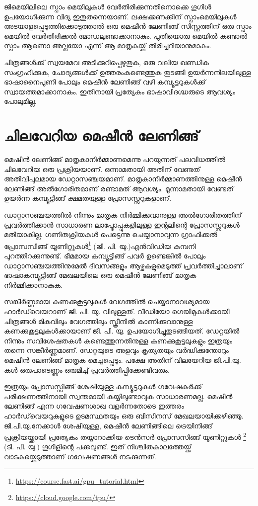 \documentclass[12pt,twoside,a4paper]{article}
\begin{document}
ജിമെയിലിലെ സ്പാം മെയിലുകൾ വേർതിരിക്കുന്നതിനൊക്കെ ഗൂഗിൾ ഉപയോഗിക്കുന്ന വിദ്യ ഇതുതന്നെയാണ്. ലക്ഷക്കണക്കിന് സ്പാംമെയിലുകൾ അടയാളപ്പെടുത്തിക്കൊടുത്താൽ ഒരു മെഷീൻ ലേണിങ്ങ് സിസ്റ്റത്തിന് ഒരു സ്പാം മെയിൽ വേർതിരിക്കൽ മോഡലുണ്ടാക്കാനാകും. പുതിയൊരു മെയിൽ കണ്ടാൽ സ്പാം ആണൊ അല്ലയോ എന്ന് ആ മാതൃകയ്ക്ക് തിരിച്ചറിയാനുമാകും.

ചിത്രങ്ങൾക്ക് സ്വയമേവ അടിക്കുറിപ്പെഴുതുക, ഒരു വലിയ ഖണ്ഡിക സംഗ്രഹിക്കുക, ചോദ്യങ്ങൾക്ക് ഉത്തരംകണ്ടെത്തുക തുടങ്ങി ഉയർന്നനിലയിലുള്ള ഭാഷാനൈപുണി പോലും മെഷീൻ ലേണിങ്ങ് വഴി കമ്പ്യൂട്ടറുകൾക്ക് സ്വായത്തമാക്കാനാകും. ഇതിനായി പ്രത്യേകം ഭാഷാവിദഗ്ദ്ധരുടെ ആവശ്യം പോലുമില്ല.

\section{ചിലവേറിയ മെഷീൻ ലേണിങ്ങ്}

മെഷീൻ ലേണിങ്ങ് മാതൃകാനിർമ്മാണമെന്നു പറയുന്നത് പലവിധത്തിൽ ചിലവേറിയ ഒരു പ്രക്രിയയാണ്. ഒന്നാമതായി അതിന് വേണ്ടത് അതിവിപുലമായ ഡേറ്റാസഞ്ചയമാണ്. മാതൃകാനിർമ്മാണത്തിനുള്ള മെഷീൻ ലേണിങ്ങ് അൽഗോരിതമാണ് രണ്ടാമത് ആവശ്യം. മൂന്നാമതായി വേണ്ടത് ഉയർന്ന കമ്പ്യൂട്ടിങ്ങ് ക്ഷമതയുള്ള പ്രോസസ്സറുകളാണ്.

ഡാറ്റാസഞ്ചയത്തിൽ നിന്നും മാതൃക നിർമ്മിക്കുവാനുള്ള അൽഗോരിതത്തിന് പ്രവർത്തിക്കാൻ സാധാരണ ലാപ്ടോപ്പുകളിലുള്ള ഇന്റലിന്റെ പ്രോസസ്സറുകൾ മതിയാകില്ല. ഗണിതക്രിയകൾ പെട്ടെന്നു ചെയ്യാനാവുന്ന ഗ്രാഫിക്കൽ പ്രോസസിങ്ങ് യൂണിറ്റുകൾ\footnote{\url{https://course.fast.ai/gpu_tutorial.html}} (ജി. പി. യു.)എൻവിഡിയ കമ്പനി പുറത്തിറക്കുന്നുണ്ട്. ഭീമമായ കമ്പ്യൂട്ടിങ്ങ് പവർ ഉണ്ടെങ്കിൽ പോലും ഡാറ്റാസഞ്ചയത്തിനുമേൽ ദിവസങ്ങളും ആഴ്ചകളുമെടുത്ത് പ്രവർത്തിച്ചാലാണ് ഭാഷാകമ്പ്യൂട്ടിങ്ങ് മേഖലയിലെ ഒരു മെഷീൻ ലേണിങ്ങ് മാതൃക നിർമ്മിക്കാനാകുക.

സങ്കീർണ്ണമായ കണക്കുകൂട്ടലുകൾ വേഗത്തിൽ ചെയ്യാനാവശ്യമായ ഹാർഡ്‌വെയറാണ് ജി. പി. യു. വിലുള്ളത്. വീഡിയോ ഗെയിമുകൾക്കായി ചിത്രങ്ങൾ മികവിലും വേഗത്തിലും സ്ക്രീനിൽ കാണിക്കുവാനുള്ള കണക്കുകൂട്ടലുകൾക്കായാണ് ജി. പി. യു. ഉപയോഗിച്ചുതുടങ്ങിയത്. ഡേറ്റയിൽ നിന്നും സവിശേഷതകൾ കണ്ടെത്തുന്നതിനുള്ള കണക്കുകൂട്ടലുകളും ഇത്രയും തന്നെ സങ്കീർണ്ണമാണ്. ഡേറ്റയുടെ അളവും കൃത്യതയും വർദ്ധിക്കുന്തോറും മെഷീൻ ലേണിങ്ങ് മാതൃക മെച്ചപ്പെടും. പക്ഷേ അതിന് വിലയേറിയ ജി.പി.യു. കൾ ഒരുപാടെണ്ണം ഒരുമിച്ച് പ്രവർത്തിപ്പിക്കേണ്ടിവരും.

ഇത്രയും പ്രോസസ്സിങ്ങ് ശേഷിയുള്ള കമ്പ്യൂട്ടറുകൾ ഗവേഷകർക്ക് പരീക്ഷണത്തിനായി സ്വന്തമായി കയ്യിലുണ്ടാവുക സാധാരണമല്ല. മെഷീൻ ലേണിങ്ങ് എന്ന ഗവേഷണശാഖ വളർന്നതോടെ ഇത്തരം ഹാർഡ്‌വെയറുകളുടെ ഉടമസ്ഥതയും ഒരു ബിസിനസ് മേഖലയായിക്കഴിഞ്ഞു. ജി.പി.യു.നേക്കാൾ ശേഷിയുള്ള, മെഷീൻ ലേണിങ്ങിലെ ട്രെയിനിങ്ങ് പ്രക്രിയയ്ക്കായി പ്രത്യേകം തയ്യാറാക്കിയ ടെൻസർ പ്രോസസിങ്ങ് യൂണിറ്റുകൾ \footnote{\url{https://cloud.google.com/tpu/}} (ടി. പി. യു.) ഗൂഗിളിന്റെ പക്കലുണ്ട്. ഇത് നിശ്ചിതകാലത്തേയ്ക്ക് വാടകയ്ക്കെടുത്താണ് ഗവേഷണങ്ങൾ നടക്കുന്നത്. 
\end{document}
